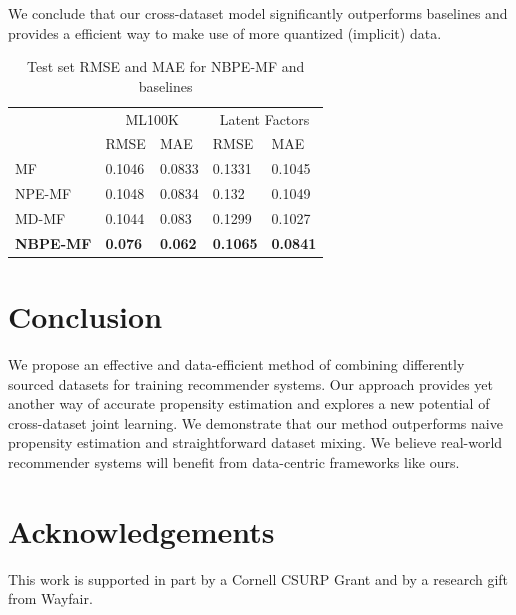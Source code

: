 \documentclass{article}
\begin{document}
We conclude that our cross-dataset model significantly outperforms baselines and provides a efficient way to make use of more quantized (implicit) data. 

\begin{table}
  \caption{Test set RMSE and MAE for NBPE-MF and baselines}
  \label{sample-table}
  \centering
  \begin{tabular}{lllll}
    \toprule               
                     & \multicolumn{2}{c}{ML100K} & \multicolumn{2}{c}{Latent Factors}                                     \\
    \cmidrule(r){2-5}
                     & RMSE                       & MAE                                & RMSE            & MAE             \\
    \midrule
    MF               & 0.1046                     & 0.0833                             & 0.1331          & 0.1045          \\ 
    NPE-MF           & 0.1048                     & 0.0834                             & 0.132           & 0.1049          \\ 
    MD-MF            & 0.1044                     & 0.083                              & 0.1299          & 0.1027          \\
    \textbf{NBPE-MF} & \textbf{0.076}             & \textbf{0.062}                     & \textbf{0.1065} & \textbf{0.0841} \\ 
    \bottomrule
  \end{tabular}
\end{table}

\section{Conclusion}
We propose an effective and data-efficient method of combining differently sourced datasets for training recommender systems. Our approach provides yet another way of accurate propensity estimation and explores a new potential of cross-dataset joint learning. We demonstrate that our method outperforms naive propensity estimation and straightforward dataset mixing. We believe real-world recommender systems will benefit from data-centric frameworks like ours.

\section*{Acknowledgements}
This work is supported in part by a Cornell CSURP Grant and by a research gift from Wayfair.



\end{document}
